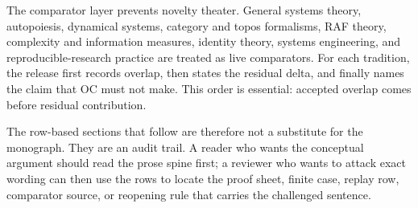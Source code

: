 The comparator layer prevents novelty theater. General systems theory, autopoiesis, dynamical systems, category and topos formalisms, RAF theory, complexity and information measures, identity theory, systems engineering, and reproducible-research practice are treated as live comparators. For each tradition, the release first records overlap, then states the residual delta, and finally names the claim that OC must not make. This order is essential: accepted overlap comes before residual contribution.

The row-based sections that follow are therefore not a substitute for the monograph. They are an audit trail. A reader who wants the conceptual argument should read the prose spine first; a reviewer who wants to attack exact wording can then use the rows to locate the proof sheet, finite case, replay row, comparator source, or reopening rule that carries the challenged sentence.
